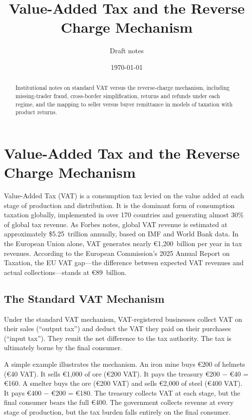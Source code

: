\documentclass[11pt]{article}
\title{Value-Added Tax and the Reverse Charge Mechanism}
\author{Draft notes}
\date{\today}
\begin{document}
\maketitle

\begin{abstract}
Institutional notes on standard VAT versus the reverse-charge mechanism,
including missing-trader fraud, cross-border simplification, returns and
refunds under each regime, and the mapping to seller versus buyer remittance
in models of taxation with product returns.
\end{abstract}

\section{Value-Added Tax and the Reverse Charge Mechanism}

Value-Added Tax (VAT) is a consumption tax levied on the value added at each stage of production and distribution. It is the dominant form of consumption taxation globally, implemented in over 170 countries and generating almost 30\% of global tax revenue. As Forbes notes, global VAT revenue is estimated at approximately \$5.25~trillion annually, based on IMF and World Bank data. In the European Union alone, VAT generates nearly €1,200~billion per year in tax revenues. According to the European Commission's 2025 Annual Report on Taxation, the EU VAT gap—the difference between expected VAT revenues and actual collections—stands at €89~billion.

\subsection{The Standard VAT Mechanism}

Under the standard VAT mechanism, VAT-registered businesses collect VAT on their sales (``output tax'') and deduct the VAT they paid on their purchases (``input tax''). They remit the net difference to the tax authority. The tax is ultimately borne by the final consumer.

A simple example illustrates the mechanism. An iron mine buys €200 of helmets (€40 VAT). It sells €1,000 of ore (€200 VAT). It pays the treasury €200 − €40 = €160. A smelter buys the ore (€200 VAT) and sells €2,000 of steel (€400 VAT). It pays €400 − €200 = €180. The treasury collects VAT at each stage, but the final consumer bears the full €400. The government collects revenue at every stage of production, but the tax burden falls entirely on the final consumer.
\end{document}
